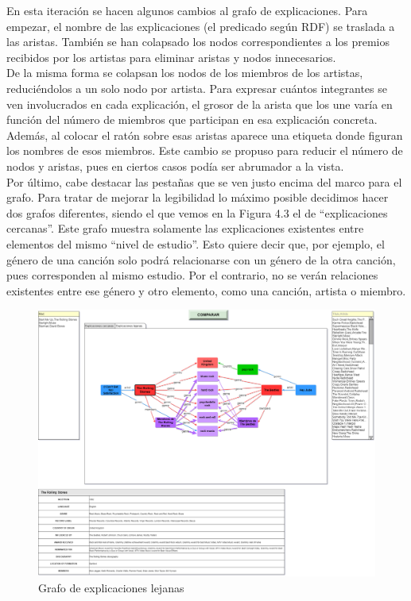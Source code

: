 En esta iteración se hacen algunos cambios al grafo de explicaciones. Para empezar, el nombre de las explicaciones (el predicado según RDF) se traslada a las aristas. También se han colapsado los nodos correspondientes a los premios recibidos por los artistas para eliminar aristas y nodos innecesarios.\\

De la misma forma se colapsan los nodos de los miembros de los artistas, reduciéndolos a un solo nodo por artista. Para expresar cuántos integrantes se ven involucrados en cada explicación, el grosor de la arista que los une varía en función del número de miembros que participan en esa explicación concreta. Además, al colocar el ratón sobre esas aristas aparece una etiqueta donde figuran los nombres de esos miembros. Este cambio se propuso para reducir el número de nodos y aristas, pues en ciertos casos podía ser abrumador a la vista.\\

Por último, cabe destacar las pestañas que se ven justo encima del marco para el grafo. Para tratar de mejorar la legibilidad lo máximo posible decidimos hacer dos grafos diferentes, siendo el que vemos en la Figura 4.3 el de ``explicaciones cercanas''. Este grafo muestra solamente las explicaciones existentes entre elementos del mismo ``nivel de estudio''. Esto quiere decir que, por ejemplo, el género de una canción solo podrá relacionarse con un género de la otra canción, pues corresponden al mismo estudio. Por el contrario, no se verán relaciones existentes entre ese género y otro elemento, como una canción, artista o miembro.\\

\begin{figure}[h!]
	\centering
	\includegraphics[width = 1\textwidth]{Imagenes/Bitmap/Tercera Interfaz (Alternativa).png}
	\caption{Grafo de explicaciones lejanas}
	\label{fig:sampleImage}
\end{figure}

